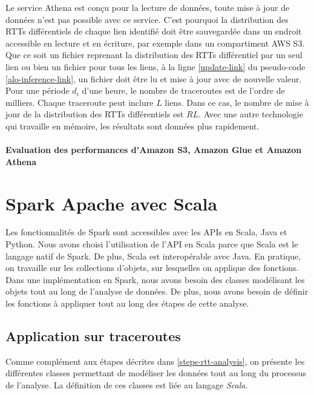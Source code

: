 Le service Athena est conçu pour la lecture de données, toute mise à jour de données n'est pas possible avec ce service. C'est pourquoi la distribution des RTTs différentiels de chaque  lien identifié doit être sauvegardée dans un endroit accessible en lecture et en écriture, par exemple dans un compartiment AWS S3. Que ce soit un fichier reprenant la distribution des RTTs différentiel  par un seul lien ou bien un fichier pour tous les liens,   à la ligne  \ref{update-link} du pseudo-code \ref{alo-inference-link}, un fichier doit être lu et mise à jour avec de nouvelle valeur. Pour une période $d_i$ d'une heure, le nombre de traceroutes est de l'ordre de milliers. Chaque traceroute peut inclure $L$ liens. Dans ce cas, le nombre de mise à jour de la distribution des RTTs différentiels est $R$\texttimes$L$. Avec une autre technologie qui travaille en mémoire, les résultats sont données plus rapidement. 



\paragraph{Evaluation des performances d'Amazon S3, Amazon Glue  et Amazon Athena }




\section{Spark Apache avec Scala}

Les fonctionnalités de Spark sont accessibles avec les  APIs en Scala, Java et Python. Nous avons choisi l'utilisation de l'API en Scala parce que Scala est le langage natif de Spark. De plus, Scala est interopérable avec Java.  En pratique, on travaille sur les collections d'objets, sur lesquelles on applique des fonctions. Dans une implémentation en Spark, nous avons besoin des classes modélisant les objets tout au long de l'analyse de données. De plus, nous avons besoin de définir les fonctions à appliquer tout au long des étapes de cette analyse.

\subsection{Application sur traceroutes}
Comme complément aux étapes décrites dans \ref{steps-rtt-analysis}, on présente les différentes classes permettant de modéliser les données tout au long du processus de l'analyse. La définition de ces classes est liée au langage \textit{Scala}. 

